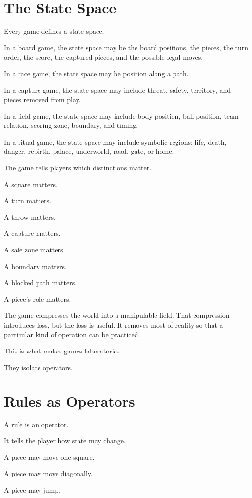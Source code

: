 \documentclass[11pt]{book}
\begin{document}
\section{The State Space}

Every game defines a state space.

In a board game, the state space may be the board positions, the pieces, the turn order, the score, the captured pieces, and the possible legal moves.

In a race game, the state space may be position along a path.

In a capture game, the state space may include threat, safety, territory, and pieces removed from play.

In a field game, the state space may include body position, ball position, team relation, scoring zone, boundary, and timing.

In a ritual game, the state space may include symbolic regions: life, death, danger, rebirth, palace, underworld, road, gate, or home.

The game tells players which distinctions matter.

A square matters.

A turn matters.

A throw matters.

A capture matters.

A safe zone matters.

A boundary matters.

A blocked path matters.

A piece's role matters.

The game compresses the world into a manipulable field. That compression introduces loss, but the loss is useful. It removes most of reality so that a particular kind of operation can be practiced.

This is what makes games laboratories.

They isolate operators.

\section{Rules as Operators}

A rule is an operator.

It tells the player how state may change.

A piece may move one square.

A piece may move diagonally.

A piece may jump.
\end{document}

